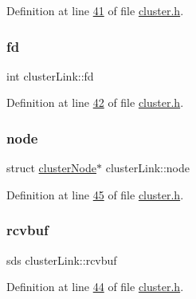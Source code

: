 Definition at line \hyperlink{cluster_8h_source_l00041}{41} of file \hyperlink{cluster_8h_source}{cluster.\+h}.

\mbox{\label{structclusterLink_a97768f8f216e1325b79f89d32f385976}} 
\subsubsection{\texorpdfstring{fd}{fd}}
{\footnotesize\ttfamily int cluster\+Link\+::fd}



Definition at line \hyperlink{cluster_8h_source_l00042}{42} of file \hyperlink{cluster_8h_source}{cluster.\+h}.

\mbox{\label{structclusterLink_af1afe49ebbbd6508d59bb4e56bbde563}} 
\subsubsection{\texorpdfstring{node}{node}}
{\footnotesize\ttfamily struct \hyperlink{structclusterNode}{cluster\+Node}$\ast$ cluster\+Link\+::node}



Definition at line \hyperlink{cluster_8h_source_l00045}{45} of file \hyperlink{cluster_8h_source}{cluster.\+h}.

\mbox{\label{structclusterLink_aa464832be4f8c9941ad3344918f25929}} 
\subsubsection{\texorpdfstring{rcvbuf}{rcvbuf}}
{\footnotesize\ttfamily sds cluster\+Link\+::rcvbuf}



Definition at line \hyperlink{cluster_8h_source_l00044}{44} of file \hyperlink{cluster_8h_source}{cluster.\+h}.

\mbox{\label{structclusterLink_a18b2dfe01bf0cfb814944020ca6cef64}} 
